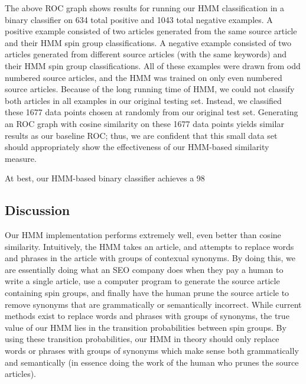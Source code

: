 \documentclass[11pt,letterpaper,oneside, titlepage]{scrartcl}
\begin{document}
\clearpage

The above ROC graph shows results for running our HMM classification in a binary classifier on 634 total positive and 1043 total negative examples. A positive example consisted of two articles generated from the same source article and their HMM spin group classifications. A negative example consisted of two articles generated from different source articles (with the same keywords) and their HMM spin group classifications. All of these examples were drawn from odd numbered source articles, and the HMM was trained on only even numbered source articles. Because of the long running time of HMM, we could not classify both articles in all examples in our original testing set. Instead, we classified these 1677 data points chosen at randomly from our original test set. Generating an ROC graph with cosine similarity on these 1677 data points yields similar results as our baseline ROC; thus, we are confident that this small data set should appropriately show the effectiveness of our HMM-based similarity measure.

At best, our HMM-based binary classifier achieves a 98%


\subsection{Discussion}

Our HMM implementation performs extremely well, even better than cosine similarity. Intuitively, the HMM takes an article, and attempts to replace words and phrases in the article with groups of contexual synonyms. By doing this, we are essentially doing what an SEO company does when they pay a human to write a single article, use a computer program to generate the source article containing spin groups, and finally have the human prune the source article to remove synonyms that are grammatically or semantically incorrect. While current methods exist to replace words and phrases with groups of synonyms, the true value of our HMM lies in the transition probabilities between spin groups. By using these transition probabilities, our HMM in theory should only replace words or phrases with groups of synonyms which make sense both grammatically and semantically (in essence doing the work of the human who prunes the source articles). 
\end{document}
